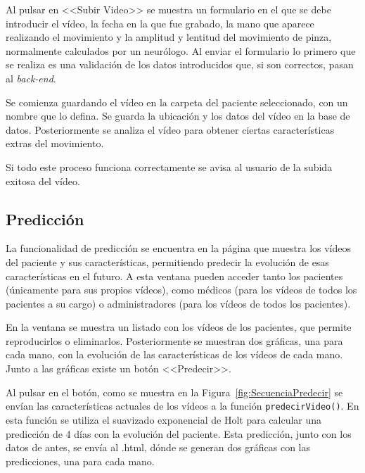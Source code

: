Al pulsar en <<Subir Video>> se muestra un formulario en el que se debe introducir el vídeo, la fecha en la que fue grabado, la mano que aparece realizando el movimiento y la amplitud y lentitud del movimiento de pinza, normalmente calculados por un neurólogo. Al enviar el formulario lo primero que se realiza es una validación de los datos introducidos que, si son correctos, pasan al \textit{back-end}.

Se comienza guardando el vídeo en la carpeta del paciente seleccionado, con un nombre que lo defina. Se guarda la ubicación y los datos del vídeo en la base de datos. Posteriormente se analiza el vídeo para obtener ciertas características extras del movimiento.

Si todo este proceso funciona correctamente se avisa al usuario de la subida exitosa del vídeo.




\subsection{Predicción}
La funcionalidad de predicción se encuentra en la página que muestra los vídeos del paciente y sus características, permitiendo predecir la evolución de esas características en el futuro. A esta ventana pueden acceder tanto los pacientes (únicamente para sus propios vídeos), como médicos (para los vídeos de todos los pacientes a su cargo) o administradores (para los vídeos de todos los pacientes).

En la ventana se muestra un listado con los vídeos de los pacientes, que permite reproducirlos o eliminarlos. Posteriormente se muestran dos gráficas, una para cada mano, con la evolución de las características de los vídeos de cada mano. Junto a las gráficas existe un botón <<Predecir>>.

Al pulsar en el botón, como se muestra en la Figura~\ref{fig:SecuenciaPredecir} se envían las características actuales de los vídeos a la función \texttt{predecirVideo()}. En esta función se utiliza el suavizado exponencial de Holt para calcular una predicción de 4 días con la evolución del paciente. Esta predicción, junto con los datos de antes, se envía al .html, dónde se generan dos gráficas con las predicciones, una para cada mano.







